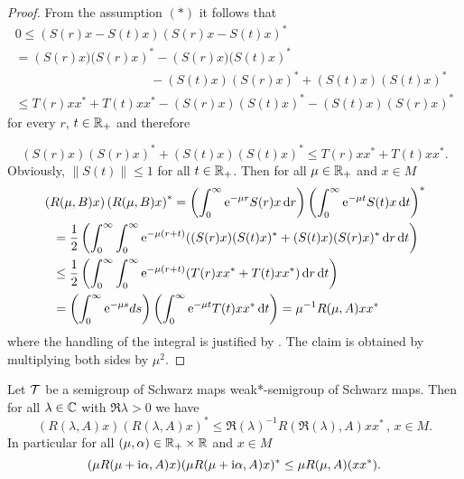 \begin{proof}
From the assumption $ (*) $ it follows that
\begin{multline*}
	0 	 \leq \left( S(r)x - S(t)x \right) \left( S(r)x - S(t)x \right)^{*} {} \\
		  = \left( S(r)x)(S(r)x \right)^{*} - \left( S(r)x)(S(t)x \right)^{*} \\
		 \phantom{(S(r)x)(S(r)x)^{*}} - (S(t)x)(S(r)x)^{*} + (S(t)x)(S(t)x)^{*}  \\
		\leq T(r)xx^{*} + T(t)xx^{*}   - (S(r)x)(S(t)x)^{*} -  
		   (S(t)x)(S(r)x)^{*}
\end{multline*}
for every $ r $, $ t \in \mathbb{R}_{+} $ and therefore

\[
	(S(r)x)(S(r)x)^{*} + (S(t)x)(S(t)x)^{*} \leq T(r)xx^{*} + T(t)xx^{*} .
\]
Obviously, $ \| S(t)\| \leq 1 $ for all $ t \in \mathbb{R}_{+} $.
Then for all $ \mu \in \mathbb{R}_{+} $ and $ x \in M $
\begin{align*}
	 {}& \left( R(\mu,B)x  \right) \left( R(\mu,B)x \right)^{*} 
		= \left( \int_{0}^\infty \mathrm{e}^{-\mu r}S(r)x \mathop{}\!\mathrm{d}{r} \right)
			\left( \int_{0}^\infty \mathrm{e}^{-\mu t}S(t)x \mathop{}\!\mathrm{d}{t} \right)^{*}   \\
	&\phantom{=}= \frac{1}{2} \left( \int_{0}^\infty \int_{0}^\infty \mathrm{e}^{-\mu(r+t)} ((S(r)x)(S(t)x)^{*}  
			+ (S(t)x)(S(r)x)^{*}  \mathop{}\!\mathrm{d}{r} \mathop{}\!\mathrm{d}{t} \right) \\
	&\phantom{=}\leq \frac{1}{2} \left(\int_{0}^\infty \int_{0}^\infty \mathrm{e}^{-\mu(r+t)} (T(r)xx^{*} + T(t)xx^{*})  			\mathop{}\!\mathrm{d}{r} \mathop{}\!\mathrm{d}{t} \right)\\
	&\phantom{=}= \left( \int_{0}^\infty \mathrm{e}^{-\mu s} ds \right)
			\left( \int_{0}^\infty \mathrm{e}^{-\mu t}T(t)xx^{*} \mathop{}\!\mathrm{d}{t} \right) 
				= \mu^{-1}R(\mu,A)xx^{*}
\end{align*}
where the handling of the integral is justified by \citet[Chap. V, §8, n° 4, Proposition 9]{bourbaki:1955}.
The claim is obtained by multiplying both sides by $\mu^{2} $. 
\end{proof}
\begin{corollary}\label{cor:d1-2.2}
Let $ \mathcal{T} $ be a semigroup of Schwarz maps \resp weak*-semigroup of Schwarz maps.
Then for all $ \lambda \in \mathbb{C} $ with $ \Re  \lambda  > 0 $ we have
\[
	\left( R(\lambda,A)x \right) \left( R(\lambda,A)x \right)^{*} 
		\leq \Re(\lambda)^{-1} R(\Re(\lambda),A)xx^{*} \, , \, x \in M .
\]
In particular for all $ (\mu,\alpha) \in \mathbb{R}_{+} \times \mathbb{R} $ and $ x \in M $
\[
(\mu R(\mu + \mathrm{i} \alpha,A)x)(\mu R(\mu + \mathrm{i} \alpha,A)x)^{*} \leq \mu R(\mu,A)(xx^{*}).
\]
\end{corollary}
